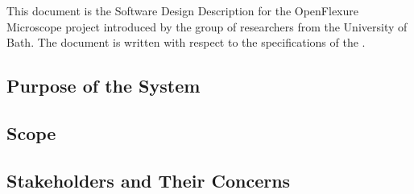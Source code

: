 This document is the Software Design Description for the OpenFlexure Microscope project introduced by the group of researchers from the University of Bath. The document is written with respect to the specifications of the \cite{ieee}.

\subsection{Purpose of the System}


\subsection{Scope}


\subsection{Stakeholders and Their Concerns}
